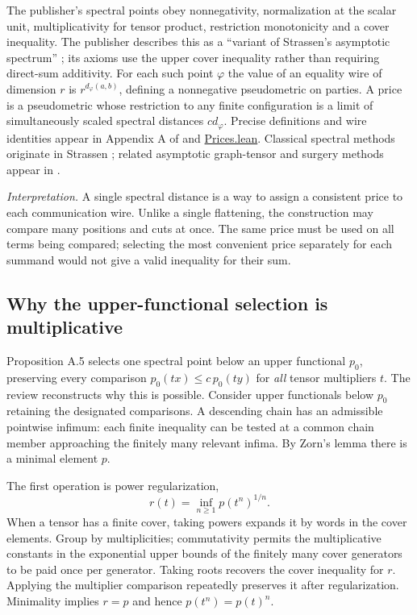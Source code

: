 \documentclass[11pt,letterpaper]{article}
\theoremstyle{definition}\newtheorem{definition}[theorem]{Definition}\newtheorem{example}[theorem]{Example}
\theoremstyle{remark}\newtheorem{remark}[theorem]{Remark}
\newcommand{\pub}[3]{\href{https://github.com/anthropics/formal-math/blob/11b6c7e3c927df2658f513b6b68ea7f8929c62c5/vp-vnp/#1\#L#2}{#3}}
\newcommand{\interpret}[1]{\par\smallskip\noindent\textit{Interpretation.} #1\par\smallskip}
\begin{document}
The publisher's spectral points obey nonnegativity, normalization at the scalar unit, multiplicativity for tensor product, restriction monotonicity and a cover inequality. The publisher describes this as a ``variant of Strassen's asymptotic spectrum'' \cite[p.~3]{claude}; its axioms use the upper cover inequality rather than requiring direct-sum additivity. For each such point $\varphi$ the value of an equality wire of dimension $r$ is $r^{d_\varphi(a,b)}$, defining a nonnegative pseudometric on parties. A price is a pseudometric whose restriction to any finite configuration is a limit of simultaneously scaled spectral distances $c d_\varphi$. Precise definitions and wire identities appear in Appendix A of \cite{claude} and \pub{Paper/Prices.lean}{23}{Prices.lean}. Classical spectral methods originate in Strassen \cite{strassen}; related asymptotic graph-tensor and surgery methods appear in \cite{cvz19,cz19}.

\interpret{A single spectral distance is a way to assign a consistent price to each communication wire. Unlike a single flattening, the construction may compare many positions and cuts at once. The same price must be used on all terms being compared; selecting the most convenient price separately for each summand would not give a valid inequality for their sum.}

\subsection{Why the upper-functional selection is multiplicative}\label{sec:gauges}
Proposition A.5 selects one spectral point below an upper functional $p_0$, preserving every comparison $p_0(tx)\le c\,p_0(ty)$ for \emph{all} tensor multipliers $t$. The review reconstructs why this is possible. Consider upper functionals below $p_0$ retaining the designated comparisons. A descending chain has an admissible pointwise infimum: each finite inequality can be tested at a common chain member approaching the finitely many relevant infima. By Zorn's lemma there is a minimal element $p$.

The first operation is power regularization,
\[
 r(t)=\inf_{n\ge1} p(t^n)^{1/n}.
\]
When a tensor has a finite cover, taking powers expands it by words in the cover elements. Group by multiplicities; commutativity permits the multiplicative constants in the exponential upper bounds of the finitely many cover generators to be paid once per generator. Taking roots recovers the cover inequality for $r$. Applying the multiplier comparison repeatedly preserves it after regularization. Minimality implies $r=p$ and hence $p(t^n)=p(t)^n$.
\end{document}
